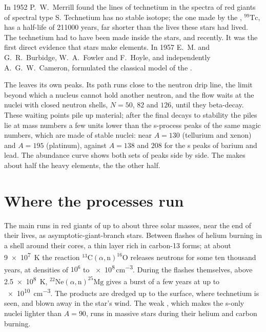 \begin{history}
In 1952 P.~W.~Merrill found the lines of technetium in the spectra of
red giants of spectral type S. Technetium has no stable isotope; the one
made by the , $^{99}\mathrm{Tc}$, has a half-life of
\num{211000} years, far shorter than the lives these stars
had lived. The technetium had to have been made inside the stars, and
recently. It was the first direct evidence that stars make elements. In
1957 E.~M. and G.~R.~Burbidge, W.~A.~Fowler and F.~Hoyle, and
independently A.~G.~W.~Cameron, formulated the classical model of the
.
\end{history}

The  leaves its own peaks. Its path runs close to the neutron
drip line, the limit beyond which a nucleus cannot hold another neutron,
and the flow waits at the nuclei with closed neutron shells, $N = 50$, $82$ and
$126$, until they beta-decay. These waiting points pile up material;
after the final decays to stability the piles lie at mass numbers a few
units lower than the s-process peaks of the same magic numbers, which
are made of stable nuclei: near $A = 130$ (tellurium and xenon) and
$A = 195$ (platinum), against $A = 138$ and $208$ for the s peaks of
barium and lead. The abundance curve shows both sets of peaks side by
side. The  makes about half the heavy elements, the 
the other half.

\section{Where the processes run}\label{sec:b3:origin-of-elements:sites}

The main  runs in red giants of up to about three solar masses, near
the end of their lives, as asymptotic-giant-branch stars. Between flashes
of helium burning in a shell around their cores, a thin layer rich in
carbon-13 forms; at about \qty{9e7}{K} the reaction
$^{13}\mathrm{C}(\alpha,\mathrm{n})^{16}\mathrm{O}$ releases neutrons
for some ten thousand years, at densities of $10^6$ to
\num{e8}\,\unit{cm^{-3}}. During the flashes themselves, above
\qty{2.5e8}{K}, $^{22}\mathrm{Ne}(\alpha,\mathrm{n})^{25}\mathrm{Mg}$
gives a burst of a few years at up to \qty{e10}{cm^{-3}}. The products
are dredged up to the surface, where technetium is seen, and blown away
in the star's wind. The weak , which makes the s-only nuclei
lighter than $A = 90$, runs in massive stars during their helium and
carbon burning.

